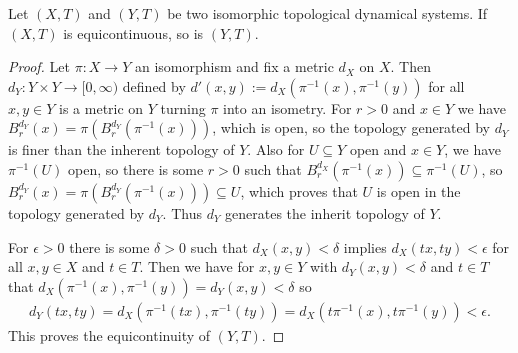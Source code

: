 \begin{proposition}
	\label{prop:equiContConjugationInvariance}
	Let $(X, T)$ and $(Y, T)$ be two isomorphic topological dynamical systems. If $(X, T)$ is equicontinuous, so is $(Y, T)$.
\end{proposition}
\begin{proof}
	Let $\pi: X \to Y$ an isomorphism and fix a metric $d_X$ on $X$. Then $d_Y: Y \times Y \to [0, \infty)$ defined by $d'(x, y):= d_X(\pi^{-1}(x), \pi^{-1}(y))$ for all $x, y \in Y$ is a metric on $Y$ turning $\pi$ into an isometry. For $r > 0$ and $x \in Y$ we have $B_r^{d_Y}(x) = \pi(B_r^{d_Y}(\pi^{-1}(x)))$, which is open, so the topology generated by $d_Y$ is finer than the inherent topology of $Y$. Also for $U \subseteq Y$ open and $x \in Y$, we have $\pi^{-1}(U)$ open, so there is some $r > 0$ such that $B_r^{d_X}(\pi^{-1}(x)) \subseteq \pi^{-1}(U)$, so $B_r^{d_Y}(x) = \pi(B_r^{d_Y}(\pi^{-1}(x))) \subseteq U$, which proves that $U$ is open in the topology generated by $d_Y$. Thus $d_Y$ generates the inherit topology of $Y$.
	
	For $\epsilon > 0$ there is some $\delta > 0$ such that $d_X(x, y) < \delta$ implies $d_X(tx, ty) < \epsilon$ for all $x, y \in X$ and $t \in T$. Then we have for $x, y \in Y$ with $d_Y(x, y) < \delta$ and $t \in T$ that $d_X(\pi^{-1}(x), \pi^{-1}(y)) = d_Y(x, y) < \delta$ so
	\begin{align*}
		d_Y(tx, ty) = d_X(\pi^{-1}(tx), \pi^{-1}(ty)) = d_X(t\pi^{-1}(x), t\pi^{-1}(y)) < \epsilon.
	\end{align*}
	This proves the equicontinuity of $(Y, T)$.
\end{proof}

